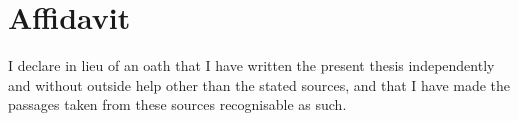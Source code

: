 \chapter*{Affidavit}

I declare in lieu of an oath that I have written the present thesis independently
and without outside help other than the stated sources, and that I have made the
passages taken from these sources recognisable as such.
